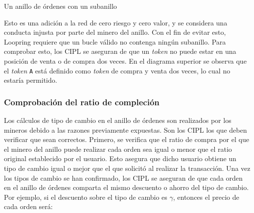 \documentclass[UTF8,nofonts]{article}
\makeatletter
\newenvironment{figurehere}
 {\def\@captype{figure}}
 {}
\makeatother
\begin{document}
\begin{multicols}{2}
\begin{center}
\begin{figurehere}

\caption{Un anillo de órdenes con un subanillo}
\label{fig:subring}
\end{figurehere}
\end{center}

Esto es una adición a la red de cero riesgo y cero valor, y se considera una conducta injusta por parte del minero del anillo. Con el fin de evitar esto, Loopring requiere que un bucle válido no contenga ningún subanillo. Para comprobar esto, los CIPL se aseguran de que un \textit{token} no puede estar en una posición de venta o de compra dos veces. En el diagrama superior se observa que el \textit{token} \verb|A| está definido como \textit{token} de compra y venta dos veces, lo cual no estaría permitido. 


\subsubsection{Comprobación del ratio de compleción\label{sec:fill_rate_check}}


Los cálculos de tipo de cambio en el anillo de órdenes son realizados por los mineros debido a las razones previamente expuestas. Son los CIPL los que deben verificar que sean correctos. Primero, se verifica que el ratio de compra por el que el minero del anillo puede realizar cada orden sea igual o menor que el ratio original establecido por el usuario. Esto asegura que dicho usuario obtiene un tipo de cambio igual o mejor que el que solicitó al realizar la transacción. Una vez los tipos de cambio se han confirmado, los CIPL se aseguran de que cada orden en el anillo de órdenes comparta el mismo descuento o ahorro del tipo de cambio. Por ejemplo, si el descuento sobre el tipo de cambio es $\gamma$, entonces el precio de cada orden será:


\end{multicols}
\end{document}
